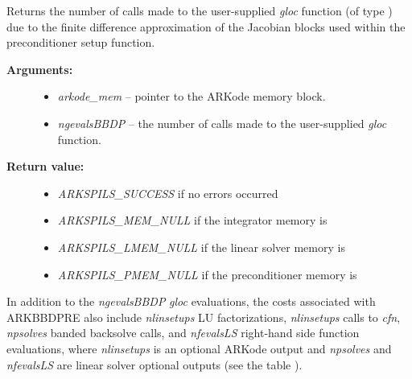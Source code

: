 \documentclass[letterpaper,10pt,english]{sphinxmanual}
\begin{document}

\begin{fulllineitems}
\label{c_interface/Preconditioners:c.ARKBBDPrecGetNumGfnEvals}
Returns the number of calls made to the user-supplied
\emph{gloc} function (of type {\hyperref[c_interface/Preconditioners:c.ARKLocalFn]{\emph{}}}) due to the finite
difference approximation of the Jacobian blocks used within the
preconditioner setup function.
\begin{description}
\item[{\textbf{Arguments:}}] \leavevmode\begin{itemize}
\item {} 
\emph{arkode\_mem} -- pointer to the ARKode memory block.

\item {} 
\emph{ngevalsBBDP} -- the number of calls made to the user-supplied
\emph{gloc} function.

\end{itemize}

\item[{\textbf{Return value:}}] \leavevmode\begin{itemize}
\item {} 
\emph{ARKSPILS\_SUCCESS} if no errors occurred

\item {} 
\emph{ARKSPILS\_MEM\_NULL} if the integrator memory is 

\item {} 
\emph{ARKSPILS\_LMEM\_NULL} if the linear solver memory is 

\item {} 
\emph{ARKSPILS\_PMEM\_NULL} if the preconditioner memory is 

\end{itemize}

\end{description}

\end{fulllineitems}


In addition to the \emph{ngevalsBBDP} \emph{gloc} evaluations, the costs
associated with ARKBBDPRE also include \emph{nlinsetups} LU
factorizations, \emph{nlinsetups} calls to \emph{cfn}, \emph{npsolves} banded
backsolve calls, and \emph{nfevalsLS} right-hand side function
evaluations, where \emph{nlinsetups} is an optional ARKode output and
\emph{npsolves} and \emph{nfevalsLS} are linear solver optional outputs (see
the table {\hyperref[c_interface/User_callable:cinterface-arkspilsoutputs]{\emph{}}}).
\end{document}
